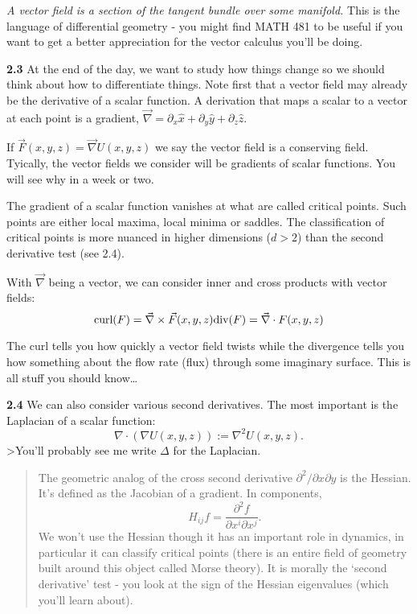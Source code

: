 \documentclass[11pt]{article}
\begin{document}
\begin{tcolorbox}[title=Some fancy geometry words]
\emph{A vector field is a
section of the tangent bundle over some manifold.} This is the
language of differential geometry - you might find MATH 481 to be useful
if you want to get a better appreciation for the vector calculus you'll
be doing. 
\end{tcolorbox}

\textbf{2.3} At the end of the day, we want to study how things change
so we should think about how to differentiate things. Note first that a
vector field may already be the derivative of a scalar function. A
derivation that maps a scalar to a vector at each point is a gradient,
\(\vec \nabla=\partial_x \hat x+\partial_y\hat y+\partial_z\hat z\).

If \(\vec F(x,y,z) =\vec \nabla U(x,y,z)\) we say the vector field is a
conserving field. Tyically, the vector fields we consider will be
gradients of scalar functions. You will see why in a week or two.

The gradient of a scalar function vanishes at what are called critical
points. Such points are either local maxima, local minima or saddles.
The classification of critical points is more nuanced in higher
dimensions (\(d>2\)) than the second derivative test (see 2.4).

With $\vec \nabla $ being a vector, we can consider inner and cross
products with vector fields: \[
\text{curl}(F) = \vec\nabla\times \vec F(x,y,z)\\
\text{div}(F) = \vec\nabla \cdot F(x,y,z)
\]

The curl tells you how quickly a vector field twists while the
divergence tells you how something about the flow rate (flux) through
some imaginary surface. This is all stuff you should know\ldots{}

\textbf{2.4} We can also consider various second derivatives. The most
important is the Laplacian of a scalar function: \[
\nabla\cdot(\nabla U(x,y,z)):=\nabla^2U(x,y,z).
\] \textgreater You'll probably see me write \(\Delta\) for the
Laplacian.

\begin{quote}
The geometric analog of the cross second derivative
\(\partial^2/\partial x\partial y\) is the Hessian. It's defined as the
Jacobian of a gradient. In components, \[
H_{ij}f=\frac{\partial^2 f}{\partial x^i\partial x^j}.
\] We won't use the Hessian though it has an important role in dynamics,
in particular it can classify critical points (there is an entire field
of geometry built around this object called Morse theory). It is morally
the `second derivative' test - you look at the sign of the Hessian
eigenvalues (which you'll learn about).
\end{quote}
\end{document}
